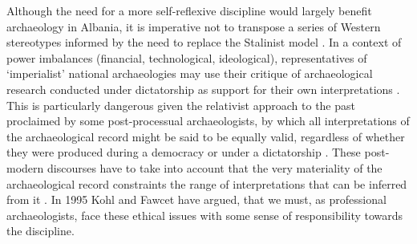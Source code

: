 	
	Although the need for a more self-reflexive discipline would largely benefit archaeology in Albania, it is imperative not to transpose a series of Western stereotypes informed by the need to replace the Stalinist model \parencite[161]{Hodges2004}. In a context of power imbalances (financial, technological, ideological), representatives of `imperialist' national archaeologies \parencite[Trigger 1984 cited in][]{Galaty2006} may use their critique of archaeological research conducted under dictatorship as support for their own interpretations \parencite[13]{Galaty2006}. This is particularly dangerous given the relativist approach to the past proclaimed by some post-processual archaeologists, by which all interpretations of the archaeological record might be said to be equally valid, regardless of whether they were produced during a democracy or under a dictatorship \parencite[Meskell 1998 cited in][]{Galaty2006}. These post-modern discourses \parencite[Meskell 1998 cited in][]{Galaty2006} have to take into account that the very materiality of the archaeological record constraints the range of interpretations that can be inferred from it \parencite[200]{Hodder1999}. 
	In 1995 Kohl and Fawcet   \parencite[cited in][]{Galaty2006} have argued, that we must, as professional archaeologists, face these ethical issues with some sense of responsibility towards the discipline.
	
